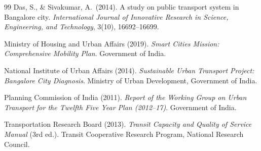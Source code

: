 \documentclass[11pt]{article}
\begin{document}
\begin{thebibliography}{99}
Das, S., \& Sivakumar, A.\ (2014). A study on public transport system in Bangalore city.
\textit{International Journal of Innovative Research in Science, Engineering, and Technology},
3(10), 16692--16699.

Ministry of Housing and Urban Affairs (2019). \textit{Smart Cities Mission: Comprehensive
Mobility Plan}. Government of India.

National Institute of Urban Affairs (2014). \textit{Sustainable Urban Transport Project:
Bangalore City Diagnosis}. Ministry of Urban Development, Government of India.

Planning Commission of India (2011). \textit{Report of the Working Group on Urban Transport for
the Twelfth Five Year Plan (2012--17)}. Government of India.

Transportation Research Board (2013). \textit{Transit Capacity and Quality of Service Manual}
(3rd ed.). Transit Cooperative Research Program, National Research Council.

\end{thebibliography}
\end{document}
